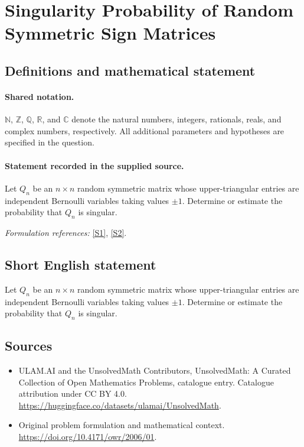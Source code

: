\documentclass[11pt]{article}
\newcommand{\sref}[2]{\hyperlink{source:#1:#2}{[S#2]}}
\begin{document}
\section{Singularity Probability of Random Symmetric Sign Matrices}\label{statement}

\subsection{Definitions and mathematical statement}

\paragraph{Shared notation.}$\mathbb N$, $\mathbb Z$, $\mathbb Q$, $\mathbb R$, and $\mathbb C$ denote the natural numbers, integers, rationals, reals, and complex numbers, respectively. All additional parameters and hypotheses are specified in the question.


\paragraph{Statement recorded in the supplied source.}
Let $Q_n$ be an $n\times n$ random symmetric matrix whose upper-triangular entries are independent Bernoulli variables taking values $\pm1$. Determine or estimate the probability that $Q_n$ is singular.
\par\smallskip\textit{Formulation references:} \sref{statement}{1}, \sref{statement}{2}.
\subsection{Short English statement}
Let $Q_n$ be an $n\times n$ random symmetric matrix whose upper-triangular entries are independent Bernoulli variables taking values $\pm1$. Determine or estimate the probability that $Q_n$ is singular.
\subsection{Sources}
\begin{itemize}
\item[\hypertarget{source:statement:1}{S1}] ULAM.AI and the UnsolvedMath Contributors, UnsolvedMath: A Curated Collection of Open Mathematics Problems, catalogue entry. Catalogue attribution under CC BY 4.0.
\url{https://huggingface.co/datasets/ulamai/UnsolvedMath}.
\item[\hypertarget{source:statement:2}{S2}] Original problem formulation and mathematical context.
\url{https://doi.org/10.4171/owr/2006/01}.
\end{itemize}
\label{end:statement}
\end{document}

